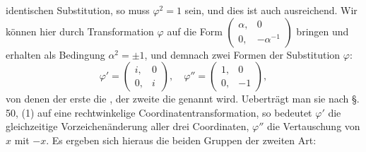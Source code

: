 
identischen Substitution, so muss $\varphi^2 = 1$ sein, und dies ist auch ausreichend. Wir k\"onnen hier durch Transformation $\varphi$ auf die Form $\begin{pmatrix} \alpha, & 0 \\ 0, & -\alpha^{-1} \end{pmatrix}$ bringen und erhalten als Bedingung $\alpha^2 = \pm 1$, und demnach zwei Formen der Substitution $\varphi$:
\[
\varphi' = \begin{pmatrix} i, & 0 \\ 0, & i \end{pmatrix}, \quad
\varphi'' = \begin{pmatrix} 1, & 0 \\ 0, & -1 \end{pmatrix},
\]
von denen der erste die , der zweite die  genannt wird. Uebertr\"agt man sie nach \S.\,50, (1) auf eine rechtwinkelige Coordinatentransformation, so bedeutet $\varphi'$ die gleichzeitige Vorzeichen\"anderung aller drei Coordinaten, $\varphi''$ die Vertauschung von $x$ mit $-x$. Es ergeben sich hieraus die beiden Gruppen der zweiten Art:

